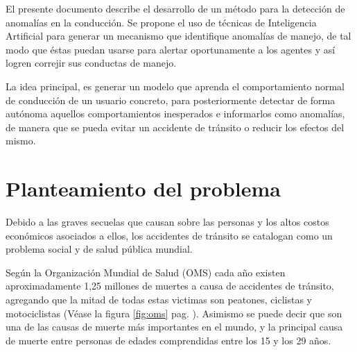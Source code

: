 
El presente documento describe el desarrollo de un m\'{e}todo para la detecci\'{o}n de anomal\'{i}as en la conducci\'{o}n. Se propone el uso de t\'{e}cnicas de Inteligencia Artificial para generar un mecanismo que identifique anomal\'{i}as de manejo, de tal modo que \'{e}stas puedan usarse para alertar oportunamente a los agentes y as\'{i} logren correjir sus conductas de manejo.

\vspace{5mm} %

La idea principal, es generar un modelo que aprenda el comportamiento normal de conducci\'{o}n de un usuario concreto, para posteriormente detectar de forma aut\'{o}noma aquellos comportamientos inesperados e informarlos como anomal\'{i}as, de manera que se pueda evitar  un accidente de tr\'{a}nsito o reducir los efectos del mismo.

\section{Planteamiento del problema}

Debido a las graves secuelas que causan sobre las personas y los altos costos econ\'{o}micos asociados a ellos, los accidentes de tr\'{a}nsito se catalogan como un problema social y de salud p\'{u}blica mundial.

\vspace{5mm} %

Seg\'{u}n la Organizaci\'{o}n Mundial de Salud (OMS) cada a\~{n}o existen aproximadamente 1,25 millones de muertes a causa de accidentes de tr\'{a}nsito, agregando que la mitad de todas estas victimas son peatones, ciclistas y motociclistas (V\'{e}ase la figura \ref{fig:oms} pag. \pageref{fig:oms}). Asimismo se puede decir que son una de las causas de muerte más importantes en el mundo, y la principal causa de muerte entre personas de edades comprendidas entre los 15 y los 29 años. 

\vspace{5mm} %

